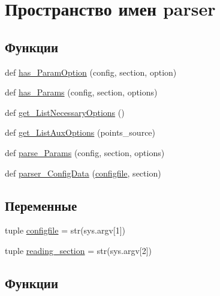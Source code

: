 \hypertarget{namespaceparser}{}\section{Пространство имен parser}
\label{namespaceparser}
\subsection*{Функции}
\begin{DoxyCompactItemize}
\item 
def \hyperlink{namespaceparser_a96637ecdb2a6e4b1760d2068aa15151f}{has\+\_\+\+Param\+Option} (config, section, option)
\item 
def \hyperlink{namespaceparser_a09f407eb0fb7be0914b202f4af08ed94}{has\+\_\+\+Params} (config, section, options)
\item 
def \hyperlink{namespaceparser_a05835075e7fcbd4794a63d7558436cbe}{get\+\_\+\+List\+Necessary\+Options} ()
\item 
def \hyperlink{namespaceparser_af5c2057df7274d2e661af2978c2a8c14}{get\+\_\+\+List\+Aux\+Options} (points\+\_\+source)
\item 
def \hyperlink{namespaceparser_a014809020e9ba4c474961dc16c778ba7}{parse\+\_\+\+Params} (config, section, options)
\item 
def \hyperlink{namespaceparser_a411809eefe1940be59a6ab7c9be4e087}{parser\+\_\+\+Config\+Data} (\hyperlink{namespaceparser_a1275ab0616c96f8c8e086ef9026a7172}{configfile}, section)
\end{DoxyCompactItemize}
\subsection*{Переменные}
\begin{DoxyCompactItemize}
\item 
tuple \hyperlink{namespaceparser_a1275ab0616c96f8c8e086ef9026a7172}{configfile} = str(sys.\+argv\mbox{[}1\mbox{]})
\item 
tuple \hyperlink{namespaceparser_aca3dd530cb507eff86255735065312bd}{reading\+\_\+section} = str(sys.\+argv\mbox{[}2\mbox{]})
\end{DoxyCompactItemize}


\subsection{Функции}
\hypertarget{namespaceparser_af5c2057df7274d2e661af2978c2a8c14}{}
